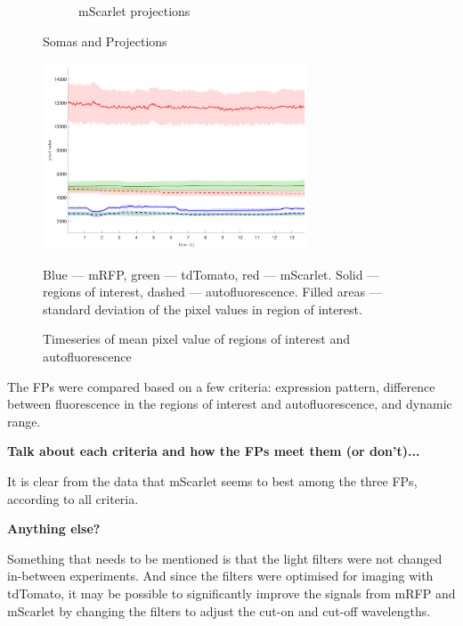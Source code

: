 \begin{figure}
\begin{subfigure}[b]{0.3\textwidth}
		\caption{mScarlet projections}
		\label{fig:mscarlet_projections}
	\end{subfigure}

	\caption{Somas and Projections}
	\label{fig:somas_projs}
\end{figure}

\begin{figure}
	\centering
	\includegraphics[width=0.7\textwidth]{intensity_timeseries}
	\caption{
		Timeseries of mean pixel value of regions of interest and autofluorescence
	}
	Blue --- mRFP, green --- tdTomato, red --- mScarlet. Solid --- regions of interest,
	dashed --- autofluorescence. Filled areas --- standard deviation of the pixel values in region
	of interest.
	\label{fig:timeseries}
\end{figure}

The FPs were compared based on a few criteria: expression pattern, difference between fluorescence
in the regions of interest and autofluorescence, and dynamic range.

\textbf{Talk about each criteria and how the FPs meet them (or don't)...}

It is clear from the data that mScarlet seems to best among the three FPs, according to all
criteria.

\textbf{Anything else?}

Something that needs to be mentioned is that the light filters were not changed in-between
experiments. And since the filters were optimised for imaging with tdTomato, it may be
possible to significantly improve the signals from mRFP and mScarlet by changing the filters to
adjust the cut-on and cut-off wavelengths.
